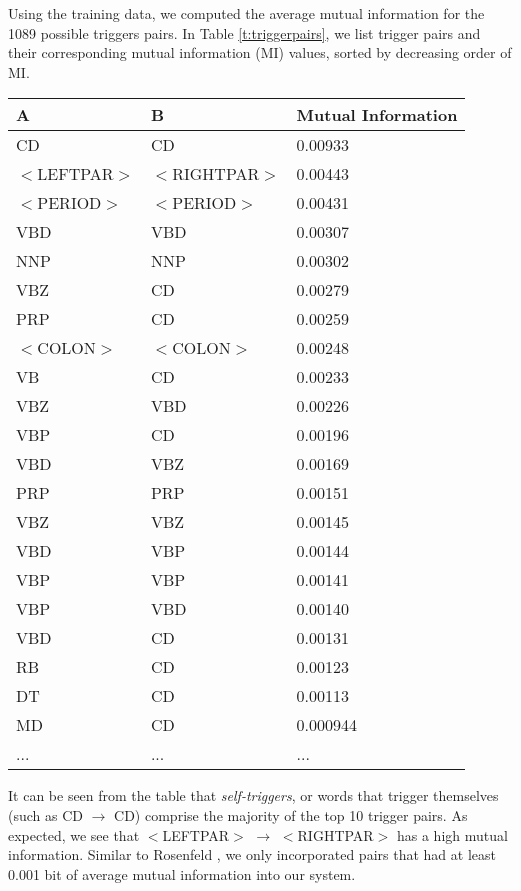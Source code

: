 \documentclass[11pt]{article}
\begin{document}
Using the training data, we computed the average mutual information for the 1089 possible triggers pairs.
In Table \ref{t:triggerpairs}, we list trigger pairs and their corresponding mutual information (MI) values, sorted by decreasing order of MI.

\begin{table*}[h!]
\begin{small}
\begin{center}
\caption{Trigger {\sf A} for word {\sf B}, sorted by MI in decreasing order}
\label{t:triggerpairs}
\begin{tabular}{|l|l|l|}
\hline
{\sf A} & {\sf B} & {\sf Mutual Information} \\
\hline
CD & CD & 0.00933 \\
$<$LEFTPAR$>$ & $<$RIGHTPAR$>$ & 0.00443 \\
$<$PERIOD$>$ & $<$PERIOD$>$ & 0.00431 \\
VBD & VBD & 0.00307 \\
NNP & NNP & 0.00302 \\
VBZ & CD & 0.00279 \\
PRP & CD & 0.00259 \\
$<$COLON$>$ & $<$COLON$>$ & 0.00248 \\
VB & CD & 0.00233 \\
VBZ & VBD & 0.00226 \\
VBP & CD & 0.00196 \\
VBD & VBZ & 0.00169 \\
PRP & PRP & 0.00151 \\
VBZ & VBZ & 0.00145 \\
VBD & VBP & 0.00144 \\
VBP & VBP & 0.00141 \\
VBP & VBD & 0.00140 \\
VBD & CD & 0.00131 \\
RB & CD & 0.00123 \\
DT & CD & 0.00113 \\
MD & CD & 0.000944 \\
... & ... & ... \\
\hline
\end{tabular}\vspace*{-5mm}
\end{center}
\end{small}
\end{table*}

\noindent
It can be seen from the table that {\em self-triggers}, or words that trigger themselves (such as CD $\rightarrow$ CD) comprise the majority of the top 10 trigger pairs.
As expected, we see that $<$LEFTPAR$>$ $\rightarrow$ $<$RIGHTPAR$>$ has a high mutual information.
Similar to Rosenfeld \cite{rosenfeld1996}, we only incorporated pairs that had at least 0.001 bit of average mutual information into our system.
\end{document}
